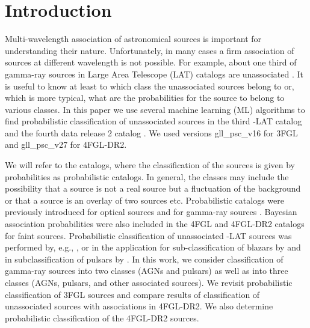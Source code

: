 \section{Introduction}

Multi-wavelength association of astronomical sources is important for understanding their nature.
Unfortunately, in many cases a firm association of sources at different wavelength is not possible.
For example, about one third of gamma-ray sources in \Fermi Large Area Telescope (LAT) catalogs are unassociated
\citep{2010ApJS..188..405A, 2012ApJS..199...31N, 2015ApJS..218...23A, 2020ApJS..247...33A}.
It is useful to know at least to which class the unassociated sources belong to or, which is more typical,
what are the probabilities for the source to belong to various classes.
In this paper we use several machine learning (ML) algorithms to find probabilistic classification of
unassociated sources in the third \Fermi-LAT catalog \citep[3FGL,][]{2015ApJS..218...23A} and the fourth data release 2 catalog
\citep[4FGL-DR2,][]{2020ApJS..247...33A, 2020arXiv200511208B}. We used  versions gll\_psc\_v16 for 3FGL
and  gll\_psc\_v27 for 4FGL-DR2.

We will refer to the catalogs, where the classification of the sources is given by probabilities as probabilistic catalogs.
In general, the classes may include the possibility that a source is not a real source but a fluctuation of the background 
or that a source is an overlay of two sources etc.
Probabilistic catalogs
were previously introduced for optical sources 
\citep[e.g.,][]{2010EAS....45..351H, 2013AJ....146....7B}
and for gamma-ray sources \citep{2017ApJ...839....4D}.
Bayesian association probabilities were also included in the 4FGL \citep{2020ApJS..247...33A} and
4FGL-DR2 \citep{2020arXiv200511208B} catalogs for faint sources.
Probabilistic classification of unassociated \Fermi-LAT sources was performed by, e.g.,
\cite{2012ApJ...753...83A, 2016ApJ...820....8S, 2016ApJ...825...69M, 2017A&A...602A..86L, 2020MNRAS.492.5377L, 
2020arXiv201205251F, 2021RAA....21...15Z},
or in the application for sub-classification of blazars by
\cite{2013MNRAS.428..220H, 2014ApJ...782...41D, 2016MNRAS.462.3180C, 2017MNRAS.470.1291S, 2019MNRAS.490.4770K, 2020MNRAS.493.1926K}
and in subclassification of pulsars by \cite{2012MNRAS.424.2832L, 2016ApJ...820....8S}.
In this work, we consider classification of gamma-ray sources into two classes (AGNs and pulsars) as well as into three classes 
(AGNs, pulsars, and other associated sources).
We revisit probabilistic classification of 3FGL sources and compare results of classification of unassociated sources
with associations in 4FGL-DR2.
We also determine probabilistic classification of the 4FGL-DR2 sources.


